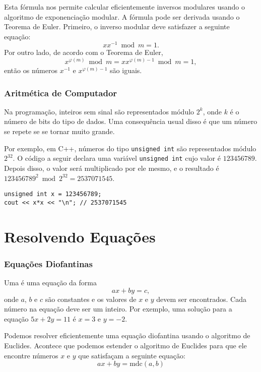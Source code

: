 Esta fórmula nos permite calcular eficientemente inversos modulares usando o algoritmo de exponenciação modular. A fórmula pode ser derivada usando o Teorema de Euler. Primeiro, o inverso modular deve satisfazer a seguinte equação:
\[
x x^{-1} \bmod m = 1.
\]
Por outro lado, de acordo com o Teorema de Euler,
\[
x^{\varphi(m)} \bmod m =  xx^{\varphi(m)-1} \bmod m = 1,
\]
então os números $x^{-1}$ e $x^{\varphi(m)-1}$ são iguais.

\subsubsection{Aritmética de Computador}

Na programação, inteiros sem sinal são representados módulo $2^k$, onde $k$ é o número de bits do tipo de dados. Uma consequência usual disso é que um número se repete se se tornar muito grande.

Por exemplo, em C++, números do tipo \texttt{unsigned int} são representados módulo $2^{32}$. O código a seguir declara uma variável \texttt{unsigned int} cujo valor é $123456789$. Depois disso, o valor será multiplicado por ele mesmo, e o resultado é $123456789^2 \bmod 2^{32} = 2537071545$.

\begin{lstlisting}
unsigned int x = 123456789;
cout << x*x << "\n"; // 2537071545
\end{lstlisting}

\section{Resolvendo Equações}

\subsubsection*{Equações Diofantinas}


Uma 
é uma equação da forma
\[ ax + by = c, \]
onde $a$, $b$ e $c$ são constantes e os valores de $x$ e $y$ devem ser encontrados. Cada número na equação deve ser um inteiro. Por exemplo, uma solução para a equação $5x+2y=11$ é $x=3$ e $y=-2$.


Podemos resolver eficientemente uma equação diofantina usando o algoritmo de Euclides. Acontece que podemos estender o algoritmo de Euclides para que ele encontre números $x$ e $y$ que satisfaçam a seguinte equação:
\[
ax + by = \textrm{mdc}(a,b)
\]

